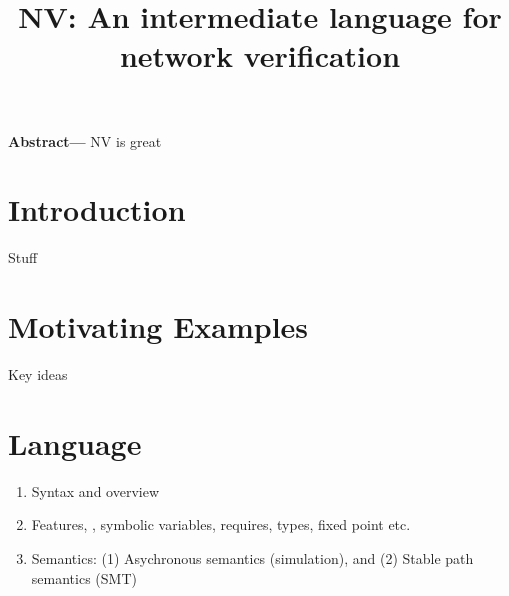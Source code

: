 \documentclass[sigconf,10pt]{acmart}
\begin{document}
\title{NV: An intermediate language for network verification}


\maketitle

%
%
%
%

\textbf{Abstract---}
NV is great

%
%
%
%

\section{Introduction} 
\label{sec:introduction}

Stuff

%
%
%
%

\section{Motivating Examples} 
\label{sec:motivation}

Key ideas

%
%
%
%

\section{Language} 
\label{sec:language}

\begin{enumerate}
  \item Syntax and overview
  \item Features, \EG, symbolic variables, requires, types, fixed point etc.
  \item Semantics: (1) Asychronous semantics (simulation), and (2) Stable path semantics (SMT)
\end{enumerate}

%
%
%
%
\end{document}
